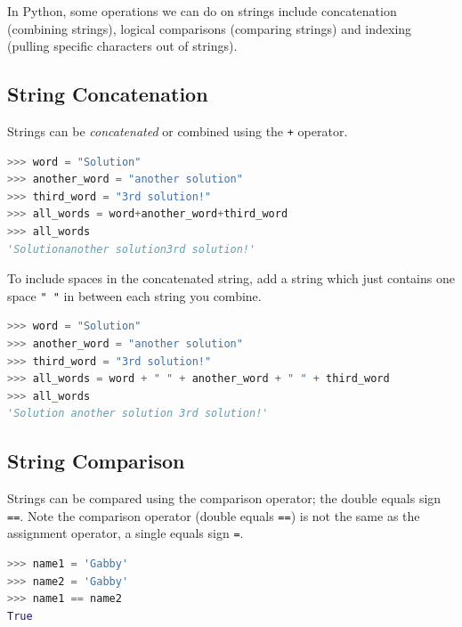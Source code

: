 \documentclass{book}
\begin{document}
In Python, some operations we can do on strings include concatenation
(combining strings), logical comparisons (comparing strings) and
indexing (pulling specific characters out of strings).
    




    
        \subsection{String Concatenation}\label{string-concatenation}
    




    
        Strings can be \emph{concatenated} or combined using the \lstinline!+!
operator.

\begin{lstlisting}[language=Python]
>>> word = "Solution"
>>> another_word = "another solution"
>>> third_word = "3rd solution!"
>>> all_words = word+another_word+third_word
>>> all_words
'Solutionanother solution3rd solution!'
\end{lstlisting}

To include spaces in the concatenated string, add a string which just
contains one space \lstinline!" "! in between each string you combine.

\begin{lstlisting}[language=Python]
>>> word = "Solution"
>>> another_word = "another solution"
>>> third_word = "3rd solution!"
>>> all_words = word + " " + another_word + " " + third_word
>>> all_words
'Solution another solution 3rd solution!'
\end{lstlisting}
    




    
        \subsection{String Comparison}\label{string-comparison}
    




    
        Strings can be compared using the comparison operator; the double equals
sign \lstinline!==!. Note the comparison operator (double equals
\lstinline!==!) is not the same as the assignment operator, a single
equals sign \lstinline!=!.

\begin{lstlisting}[language=Python]
>>> name1 = 'Gabby'
>>> name2 = 'Gabby'
>>> name1 == name2
True
\end{lstlisting}
\end{document}
